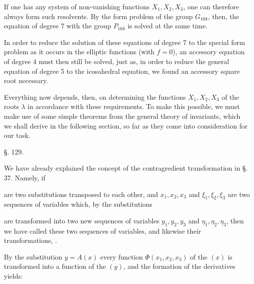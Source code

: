 If one has any system of non-vanishing functions $X_1, X_2, X_3$, one can therefore always form such resolvents. By the form problem of the group $G_{168}$, then, the equation of degree 7 with the group $P_{168}$ is solved at the same time.

In order to reduce the solution of these equations of degree 7 to the special form problem as it occurs in the elliptic functions (with $f = 0$), an accessory equation of degree 4 must then still be solved, just as, in order to reduce the general equation of degree 5 to the icosahedral equation, we found an accessory square root necessary.

Everything now depends, then, on determining the functions $X_1, X_2, X_3$ of the roots $\lambda$ in accordance with these requirements. To make this possible, we must make use of some simple theorems from the general theory of invariants, which we shall derive in the following section, so far as they come into consideration for our task.

\begin{center}
§. 129.

\end{center}

We have already explained the concept of the contragredient transformation in §.\,37. Namely, if


are two substitutions transposed to each other, and $x_1, x_2, x_3$ and $\xi_1, \xi_2, \xi_3$ are two sequences of variables which, by the substitutions


are transformed into two new sequences of variables $y_1, y_2, y_3$ and $\eta_1, \eta_2, \eta_3$, then we have called these two sequences of variables, and likewise their transformations, .

By the substitution $y = A(x)$ every function $\Phi(x_1, x_2, x_3)$ of the $(x)$ is transformed into a function of the $(y)$, and the formation of the derivatives yields:

